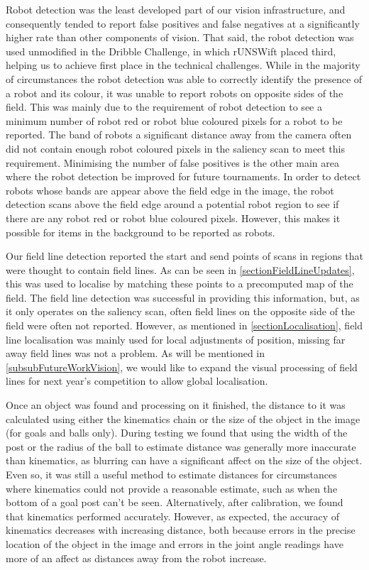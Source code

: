 \documentclass[pdftex,11pt,a4paper]{report}
\begin{document}
Robot detection was the least developed part of our vision infrastructure, and consequently tended to report false positives and false negatives at a significantly higher rate than other components of vision. That said, the robot detection was used unmodified in the Dribble Challenge, in which rUNSWift placed third, helping us to achieve first place in the technical challenges. While in the majority of circumstances the robot detection was able to correctly identify the presence of a  robot and its colour, it was unable to report robots on opposite sides of the field. This was mainly due to the requirement of robot detection to see a minimum number of robot red or robot blue coloured pixels for a robot to be reported. The band of robots a significant distance away from the camera often did not contain enough robot coloured pixels in the saliency scan to meet this requirement. Minimising the number of false positives is the other main area where the robot detection be improved for future tournaments. In order to detect robots whose bands are appear above the field edge in the image, the robot detection scans above the field edge around a potential robot region to see if there are any robot red or robot blue coloured pixels. However, this makes it possible for items in the background to be reported as robots. 

Our field line detection reported the start and send points of scans in regions that were thought to contain field lines. As can be seen in \autoref{sectionFieldLineUpdates}, this was used to localise by matching these points to a precomputed map of the field. The field line detection was successful in providing this information, but, as it only operates on the saliency scan, often field lines on the opposite side of the field were often not reported. However, as mentioned in \autoref{sectionLocalisation}, field line localisation was mainly used for local adjustments of position, missing far away field lines was not a problem. As will be mentioned in \autoref{subsubFutureWorkVision}, we would like to expand the visual processing of field lines for next year's competition to allow global localisation. 

Once an object was found and processing on it finished, the distance to it was
calculated using either the kinematics chain or the size of the object in the
image (for goals and balls only). During testing we found that using the width
of the post or the radius of the ball to estimate distance was generally more
inaccurate than kinematics, as blurring can have a significant affect on the
size of the object. Even so, it was still a useful method to estimate distances
for circumstances where kinematics could not provide a reasonable estimate, such
as when the bottom of a goal post can't be seen. Alternatively, after
calibration, we found that kinematics performed accurately. However, as
expected, the accuracy of kinematics decreases with increasing distance, both
because errors in the precise location of the object in the image and errors in
the joint angle readings have more of an affect as distances away from the robot
increase. 
\end{document}
